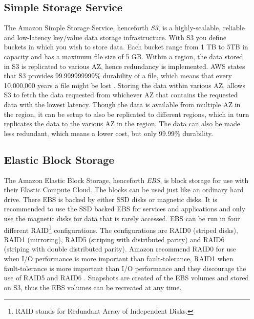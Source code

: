\documentclass[11pt]{report}
\begin{document}
\subsection{Simple Storage Service}
The Amazon Simple Storage Service, henceforth \emph{S3}, is a highly-scalable, reliable and low-latency key/value data storage infrastructure. With S3 you define buckets in which you wish to store data. Each bucket range from 1 TB to 5TB in capacity and has a maximum file size of 5 GB. Within a region, the data stored in S3 is replicated to various AZ, hence redundancy is implemented. AWS states that S3 provides 99.999999999\% durability of a file, which means that every 10,000,000 years a file might be lost \cite{AWS_S3_FAQ}. Storing the data within various AZ, allows S3 to fetch the data requested from whichever AZ that contains the requested data with the lowest latency. Though the data is available from multiple AZ in the region, it can be setup to also be replicated to different regions, which in turn replicates the data to the various AZ in the region. The data can also be made less redundant, which means a lower cost, but only 99.99\% durability.

\subsection{Elastic Block Storage}
The Amazon Elastic Block Storage, henceforth \emph{EBS}, is block storage for use with their Elastic Compute Cloud. The blocks can be used just like an ordinary hard drive. There EBS is backed by either SSD disks or magnetic disks. It is recommended to use the SSD backed EBS for services and applications and only use the magnetic disks for data that is rarely accessed. EBS can be run in four different RAID\footnote{RAID stands for Redundant Array of Independent Disks.} configurations. The configurations are RAID0 (striped disks), RAID1 (mirroring), RAID5 (striping with distributed parity) and RAID6 (striping with double distributed parity). Amazon recommend RAID0 for use when I/O performance is more important than fault-tolerance, RAID1 when fault-tolerance is more important than I/O performance and they discourage the use of RAID5 and RAID6 \cite{AWS_raid_config}. Snapshots are created of the EBS volumes and stored on S3, thus the EBS volumes can be recreated at any time.
\end{document}
